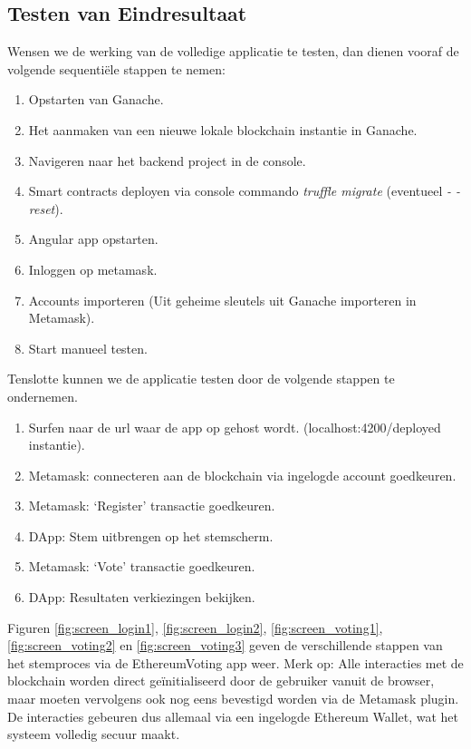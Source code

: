 	\subsection{Testen van Eindresultaat}
	Wensen we de werking van de volledige applicatie te testen, dan dienen vooraf de volgende sequentiële stappen te nemen:
	
	\begin{enumerate}
		\item Opstarten van Ganache.
		\item Het aanmaken van een nieuwe lokale blockchain instantie in Ganache.
		\item Navigeren naar het backend project in de console.
		\item Smart contracts deployen via console commando \textit{truffle migrate} (eventueel \textit{- -reset}).
		\item Angular app opstarten.
		\item Inloggen op metamask.
		\item Accounts importeren (Uit geheime sleutels uit Ganache importeren in Metamask).
		\item Start manueel testen.
	\end{enumerate}
	Tenslotte kunnen we de applicatie testen door de volgende stappen te ondernemen.
	\begin{enumerate}
		\item Surfen naar de url waar de app op gehost wordt. (localhost:4200/deployed instantie).
		\item Metamask: connecteren aan de blockchain via ingelogde account goedkeuren.
		\item Metamask: `Register' transactie goedkeuren.
		\item DApp: Stem uitbrengen op het stemscherm.
		\item Metamask: `Vote' transactie goedkeuren.
		\item DApp: Resultaten verkiezingen bekijken.
	\end{enumerate}
	Figuren \ref{fig:screen_login1}, \ref{fig:screen_login2}, \ref{fig:screen_voting1}, \ref{fig:screen_voting2}  en \ref{fig:screen_voting3} geven de verschillende stappen van het stemproces via de EthereumVoting  app weer. Merk op: Alle interacties met de blockchain worden direct geïnitialiseerd door de gebruiker vanuit de browser, maar moeten vervolgens ook nog eens bevestigd worden via de Metamask plugin. De interacties gebeuren dus allemaal via een ingelogde Ethereum Wallet, wat het systeem volledig secuur maakt.

